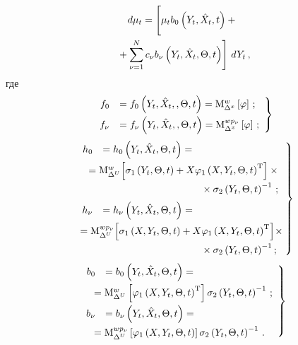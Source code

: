 \begin{multicols}{2}
    \vspace*{-12pt}
    
    \noindent
    \begin{multline}
    d\mu_t =\left[
    \vphantom{\sum\limits^N_{\nu=1}}
    \mu_t b_0 \left(Y_t,\hat
    X_t,t\right)+{}\right.\\
\left.    {}+\sss_{\nu=1}^N c_\nu b_\nu \left(Y_t,\hat X_t,\Theta, t\right) \right]
\, dY_t\,,
\label{e3.7-s}
\end{multline}
где
   \begin{equation}
   \left.
   \begin{array}{rl}
   f_0&=f_0 \left(Y_t,\hat X_t,,\Theta, t\right) =
   {\rm M}_{\Delta^x}^{w} \left[ \varphi\right]\,;\\[6pt]
    f_\nu&=f_\nu \left(Y_t,\hat X_t,,\Theta, t\right) =
    {\rm M}_{\Delta^x}^{w p_\nu} \left[ \varphi\right]\,;
    \end{array}
    \right\}
    \label{e3.8-s}
    \end{equation}
      \begin{equation}
\left.
\begin{array}{rl}
    h_0&=h_0 \left(Y_t,\hat X_t,\Theta, t\right) ={}\\[6pt]
    &\hspace*{-6mm}{}=
    \mm_{\Delta^U}^{w} \!\lk \sigma_1 \left(Y_t,\Theta, t\right)+
    X\varphi_1 \left(X,Y_t,\Theta, t\right)^{\mathrm{T}}\rk\times{}\\[6pt]
    &\hspace*{35mm}{}\times \sigma_2 \left(Y_t,\Theta,t\right)^{-1}\,;\\[6pt]
    h_\nu&= h_\nu \left(Y_t,\hat X_t,\Theta, t\right)={}\\[6pt]
    &\hspace*{-9mm}{}=\mm_{\Delta^U}^{w p_\nu}  \!\lk \sigma_1 \left(X,Y_t,\Theta, t\right)+ X\varphi_1
   \left( X,Y_t,\Theta, t\right)^{\mathrm{T}}\rk\!\times\!{}\\[6pt]
   &\hspace*{35mm}{}\times  \sigma_2 \left(Y_t,\Theta,t\right)^{-1};
   \end{array}\!\!
   \right\}\!\!
   \label{e3.9-s}
   \end{equation}
   \begin{equation}
   \left.
   \begin{array}{rl}
    b_0&= b_0 \left(Y_t,\hat X_t,\Theta, t\right)
    ={}\\[6pt]
    &\hspace*{-5mm}{}=\mm_{\Delta^U}^{w} \lk \varphi_1 \left(X,Y_t,\Theta, t\right)^{\mathrm{T}} \rk 
    \sigma_2\left(Y_t,\Theta,t\right)^{-1}\,;\\[6pt]
    b_\nu&=b_\nu \left(Y_t,\hat X_t,\Theta, t\right)
={}\\[6pt]
&\hspace*{-5mm}{}=\mm_{\Delta^U}^{w p_\nu} \lk \varphi_1\left(X,Y_t,\Theta, t\right) \rk \sigma_2
\left(Y_t,\Theta,t\right)^{-1}\,.
\end{array}
\right\}
\label{e3.10-s}
\end{equation}


\end{multicols}
